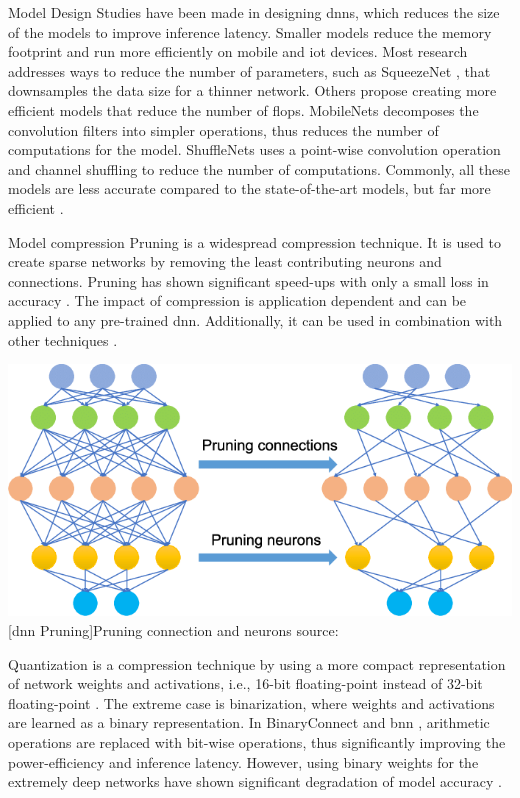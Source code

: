 \begin{enumdescript}
	\item[Model Design] Studies have been made in designing \gls{dnn}s, which reduces the size of the models to improve inference latency. Smaller models reduce the memory footprint and run more efficiently on mobile and \gls{iot} devices. Most research addresses ways to reduce the number of parameters, such as SqueezeNet \cite{iandola_squeezenet:_2016}, that downsamples the data size for a thinner network. Others propose creating more efficient models that reduce the number of \acrshort{flop}s. MobileNets \cite{howard_mobilenets:_2017,sandler_mobilenetv2:_2018} decomposes the convolution filters into simpler operations, thus reduces the number of computations for the model. ShuffleNets \cite{zhang_shufflenet:_2017, ma_shufflenet_2018} uses a point-wise convolution operation and channel shuffling to reduce the number of computations. Commonly, all these models are less accurate compared to the state-of-the-art models, but far more efficient \cite{bianco_benchmark_2018}. 
		
	\item[Model compression] Pruning is a widespread compression technique. It is used to create sparse networks by removing the least contributing neurons and connections. Pruning has shown significant speed-ups with only a small loss in accuracy \cite{zhou_edge_2019}. The impact of compression is application dependent and can be applied to any pre-trained \gls{dnn}. Additionally, it can be used in combination with other techniques \cite{cheng_survey_2017}.
	
	\begin{minipage}[t]{\linewidth}
		\centering
		\includegraphics[width=.5\linewidth]{figures/articles/Pruning-a-neural-network}
		[\gls{dnn} Pruning]{Pruning connection and neurons source:  \cite{chen_deep_2019}}
	\end{minipage}
	
	Quantization is a compression technique by using a more compact representation of network weights and activations, i.e., 16-bit floating-point instead of 32-bit floating-point \cite{cheng_survey_2017}. The extreme case is binarization, where weights and activations are learned as a binary representation. In BinaryConnect \cite{courbariaux_binaryconnect:_2015} and \gls{bnn} \cite{courbariaux_binarized_2016}, arithmetic operations are replaced with bit-wise operations, thus significantly improving the power-efficiency and inference latency. However, using binary weights for the extremely deep networks have shown significant degradation of model accuracy \cite{cheng_survey_2017}.
	

\end{enumdescript}
